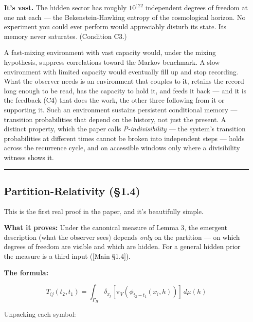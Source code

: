 \documentclass[
]{article}
\begin{document}
\textbf{It's vast.} The hidden sector has roughly \(10^{122}\)
independent degrees of freedom at one nat each --- the
Bekenstein-Hawking entropy of the cosmological horizon. No experiment
you could ever perform would appreciably disturb its state. Its memory
never saturates. (Condition C3.)

A fast-mixing environment with vast capacity would, under the mixing
hypothesis, suppress correlations toward the Markov benchmark. A slow
environment with limited capacity would eventually fill up and stop
recording. What the observer needs is an environment that couples to it,
retains the record long enough to be read, has the capacity to hold it,
and feeds it back --- and it is the feedback (C4) that does the work,
the other three following from it or supporting it. Such an environment
sustains persistent conditional memory --- transition probabilities that
depend on the history, not just the present. A distinct property, which
the paper calls \emph{P-indivisibility} --- the system's transition
probabilities at different times cannot be broken into independent steps
--- holds across the recurrence cycle, and on accessible windows only
where a divisibility witness shows it.

\begin{center}\rule{0.5\linewidth}{0.5pt}\end{center}

\hypertarget{partition-relativity-1.4}{%
\subsection{Partition-Relativity
(§1.4)}\label{partition-relativity-1.4}}

This is the first real proof in the paper, and it's beautifully simple.

\textbf{What it proves:} Under the canonical measure of Lemma 3, the
emergent description (what the observer sees) depends \emph{only} on the
partition --- on which degrees of freedom are visible and which are
hidden. For a general hidden prior the measure is a third input ({[}Main
§1.4{]}).

\textbf{The formula:}

\[T_{ij}(t_2, t_1) = \int_{\Gamma_H} \delta_{x_j}[\pi_V(\phi_{t_2-t_1}(x_i, h))] \, d\mu(h)\]

Unpacking each symbol:
\end{document}
